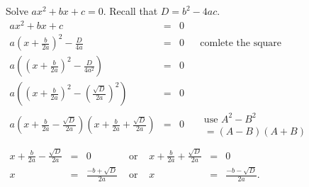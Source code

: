\begin{frame}
\begin{problem}
Solve $ax^2+bx+c=0$. Recall that $D=b^2-4ac$.
$
\begin{array}{rcll|l}
\displaystyle ax^2+bx+c&=&0 \\
\displaystyle a\left(x +\frac{b }{2a}  \right)^2- \frac{D}{4a}&=& 0&&\text{comlete the square}\\
\displaystyle a\left(\left(x +\frac{b }{2a} \right)^2- \frac{D}{4a^2}\right)&=& 0\\
\displaystyle a\left(\left(x +\frac{b }{2a} \right)^2- \left( \frac{ \sqrt{D }}{2 a}\right)^2\right)&=& 0\\
\displaystyle a\left(x+\frac{b }{2a}-\frac{\sqrt{D}}{2a} \right)\left(x+\frac{b }{2a}+\frac{\sqrt{D}}{2a} \right)&=&0 &&\begin{array}{l} \text{use } A^2-B^2\\ =(A-B)(A+B)\end{array} \\
\end{array}
$
$
\begin{array}{rclcrcl}
\displaystyle x+\frac{b}{2a}-\frac{\sqrt{D}}{2a}&=&0 &\text{ or } & \displaystyle x+\frac{b}{2a}+\frac{\sqrt{D}}{2a}&=&0\\
x&=&\displaystyle \frac{-b+\sqrt{D}}{2a} & \text{ or } & x&=&\displaystyle \frac{-b-\sqrt{D}}{2a}.
\end{array}
$
\end{problem}
\end{frame}


